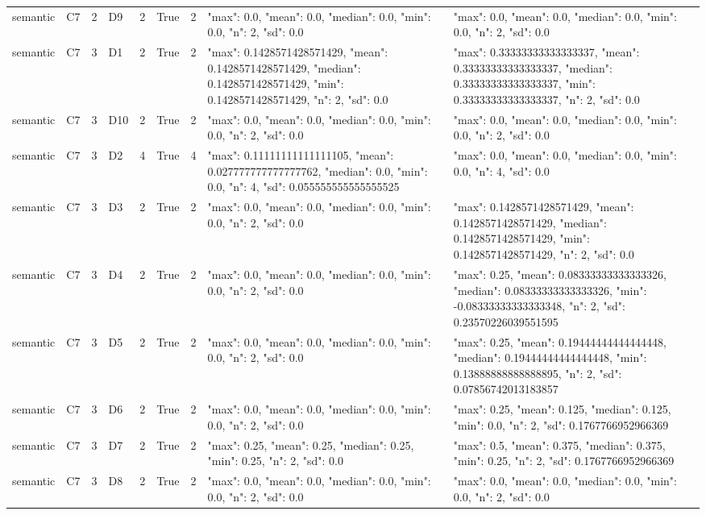 \begin{tabular}{lllllllll}
semantic & C7 & 2 & D9 & 2 & True & 2 & {"max": 0.0, "mean": 0.0, "median": 0.0, "min": 0.0, "n": 2, "sd": 0.0} & {"max": 0.0, "mean": 0.0, "median": 0.0, "min": 0.0, "n": 2, "sd": 0.0} \\
semantic & C7 & 3 & D1 & 2 & True & 2 & {"max": 0.1428571428571429, "mean": 0.1428571428571429, "median": 0.1428571428571429, "min": 0.1428571428571429, "n": 2, "sd": 0.0} & {"max": 0.33333333333333337, "mean": 0.33333333333333337, "median": 0.33333333333333337, "min": 0.33333333333333337, "n": 2, "sd": 0.0} \\
semantic & C7 & 3 & D10 & 2 & True & 2 & {"max": 0.0, "mean": 0.0, "median": 0.0, "min": 0.0, "n": 2, "sd": 0.0} & {"max": 0.0, "mean": 0.0, "median": 0.0, "min": 0.0, "n": 2, "sd": 0.0} \\
semantic & C7 & 3 & D2 & 4 & True & 4 & {"max": 0.11111111111111105, "mean": 0.027777777777777762, "median": 0.0, "min": 0.0, "n": 4, "sd": 0.055555555555555525} & {"max": 0.0, "mean": 0.0, "median": 0.0, "min": 0.0, "n": 4, "sd": 0.0} \\
semantic & C7 & 3 & D3 & 2 & True & 2 & {"max": 0.0, "mean": 0.0, "median": 0.0, "min": 0.0, "n": 2, "sd": 0.0} & {"max": 0.1428571428571429, "mean": 0.1428571428571429, "median": 0.1428571428571429, "min": 0.1428571428571429, "n": 2, "sd": 0.0} \\
semantic & C7 & 3 & D4 & 2 & True & 2 & {"max": 0.0, "mean": 0.0, "median": 0.0, "min": 0.0, "n": 2, "sd": 0.0} & {"max": 0.25, "mean": 0.08333333333333326, "median": 0.08333333333333326, "min": -0.08333333333333348, "n": 2, "sd": 0.23570226039551595} \\
semantic & C7 & 3 & D5 & 2 & True & 2 & {"max": 0.0, "mean": 0.0, "median": 0.0, "min": 0.0, "n": 2, "sd": 0.0} & {"max": 0.25, "mean": 0.19444444444444448, "median": 0.19444444444444448, "min": 0.13888888888888895, "n": 2, "sd": 0.07856742013183857} \\
semantic & C7 & 3 & D6 & 2 & True & 2 & {"max": 0.0, "mean": 0.0, "median": 0.0, "min": 0.0, "n": 2, "sd": 0.0} & {"max": 0.25, "mean": 0.125, "median": 0.125, "min": 0.0, "n": 2, "sd": 0.1767766952966369} \\
semantic & C7 & 3 & D7 & 2 & True & 2 & {"max": 0.25, "mean": 0.25, "median": 0.25, "min": 0.25, "n": 2, "sd": 0.0} & {"max": 0.5, "mean": 0.375, "median": 0.375, "min": 0.25, "n": 2, "sd": 0.1767766952966369} \\
semantic & C7 & 3 & D8 & 2 & True & 2 & {"max": 0.0, "mean": 0.0, "median": 0.0, "min": 0.0, "n": 2, "sd": 0.0} & {"max": 0.0, "mean": 0.0, "median": 0.0, "min": 0.0, "n": 2, "sd": 0.0} \\

\end{tabular}
